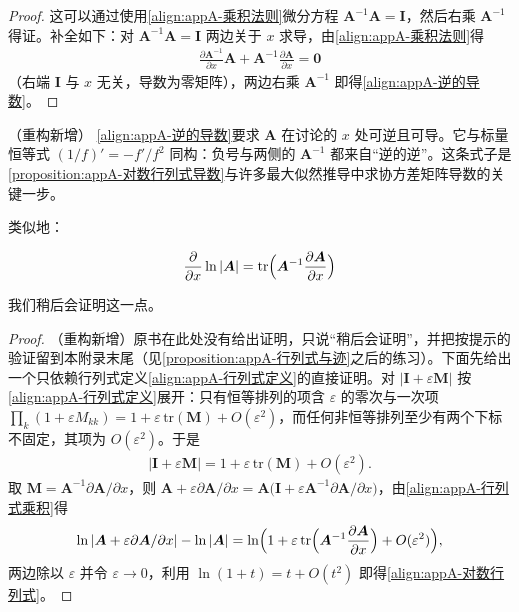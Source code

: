 \documentclass[../main.tex]{subfiles}
\begin{document}
\begin{proof}
这可以通过使用\eqref{align:appA-乘积法则}微分方程 $\bm{A}^{-1}\bm{A}=\bm{I}$，然后右乘 $\bm{A}^{-1}$ 得证。补全如下：对 $\bm{A}^{-1}\bm{A}=\bm{I}$ 两边关于 $x$ 求导，由\eqref{align:appA-乘积法则}得
\begin{align*}
  \frac{\partial\bm{A}^{-1}}{\partial x}\bm{A}+\bm{A}^{-1}\frac{\partial\bm{A}}{\partial x}=\bm{0}
\end{align*}
（右端 $\bm{I}$ 与 $x$ 无关，导数为零矩阵），两边右乘 $\bm{A}^{-1}$ 即得\eqref{align:appA-逆的导数}。
\end{proof}

\begin{remark}（重构新增）
\eqref{align:appA-逆的导数}要求 $\bm{A}$ 在讨论的 $x$ 处可逆且可导。它与标量恒等式 $(1/f)'=-f'/f^{2}$ 同构：负号与两侧的 $\bm{A}^{-1}$ 都来自“逆的逆”。这条式子是\cref{proposition:appA-对数行列式导数}与许多最大似然推导中求协方差矩阵导数的关键一步。
\end{remark}

类似地：
\begin{proposition}[对数行列式关于标量的导数]\label{proposition:appA-对数行列式导数}
\begin{align}
  \frac{\partial}{\partial x}\ln|\bm{A}|=\mathrm{tr}\Bigl(\bm{A}^{-1}\frac{\partial\bm{A}}{\partial x}\Bigr)
  \label{align:appA-对数行列式}
\end{align}
\end{proposition}

我们稍后会证明这一点。

\begin{proof}
（重构新增）原书在此处没有给出证明，只说“稍后会证明”，并把按提示的验证留到本附录末尾（见\cref{proposition:appA-行列式与迹}之后的练习）。下面先给出一个只依赖行列式定义\eqref{align:appA-行列式定义}的直接证明。对 $|\bm{I}+\varepsilon\bm{M}|$ 按\eqref{align:appA-行列式定义}展开：只有恒等排列的项含 $\varepsilon$ 的零次与一次项 $\prod_k(1+\varepsilon M_{kk})=1+\varepsilon\,\mathrm{tr}(\bm{M})+O(\varepsilon^{2})$，而任何非恒等排列至少有两个下标不固定，其项为 $O(\varepsilon^{2})$。于是
\begin{align*}
  |\bm{I}+\varepsilon\bm{M}|=1+\varepsilon\,\mathrm{tr}(\bm{M})+O(\varepsilon^{2}).
\end{align*}
取 $\bm{M}=\bm{A}^{-1}\partial\bm{A}/\partial x$，则 $\bm{A}+\varepsilon\partial\bm{A}/\partial x=\bm{A}\bigl(\bm{I}+\varepsilon\bm{A}^{-1}\partial\bm{A}/\partial x\bigr)$，由\eqref{align:appA-行列式乘积}得
\begin{align*}
  \ln|\bm{A}+\varepsilon\partial\bm{A}/\partial x|-\ln|\bm{A}|=\ln\Bigl(1+\varepsilon\,\mathrm{tr}\Bigl(\bm{A}^{-1}\frac{\partial\bm{A}}{\partial x}\Bigr)+O(\varepsilon^{2})\Bigr),
\end{align*}
两边除以 $\varepsilon$ 并令 $\varepsilon\to0$，利用 $\ln(1+t)=t+O(t^{2})$ 即得\eqref{align:appA-对数行列式}。
\end{proof}
\end{document}

